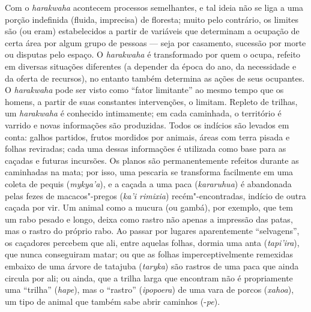 Com o \emph{harakwaha} acontecem processos semelhantes, e tal ideia não
se liga a uma porção indefinida (fluida, imprecisa) de floresta; muito
pelo contrário, os limites são (ou eram) estabelecidos a partir de
variáveis que determinam a ocupação de certa área por algum grupo de
pessoas --- seja por casamento, sucessão por morte ou disputas pelo
espaço. O \emph{harakwaha} é transformado por quem o ocupa, refeito em
diversas situações diferentes (a depender da época do ano, da
necessidade e da oferta de recursos), no entanto também determina as
ações de seus ocupantes. O \emph{harakwaha} pode ser visto como ``fator
limitante'' ao mesmo tempo que os homens, a partir de suas constantes
intervenções, o limitam. Repleto de trilhas, um \emph{harakwaha} é
conhecido intimamente; em cada caminhada, o território é varrido e novas
informações são produzidas. Todos os indícios são levados em conta:
galhos partidos, frutos mordidos por animais, áreas com terra pisada e
folhas reviradas; cada uma dessas informações é utilizada como base para
as caçadas e futuras incursões. Os planos são permanentemente refeitos
durante as caminhadas na mata; por isso, uma pescaria se transforma
facilmente em uma coleta de pequis (\emph{mykya'a}), e a caçada a uma
paca (\emph{kararuhua}) é abandonada pelas fezes de macacos"-pregos
(\emph{ka'i rimixia}) recém"-encontradas, indício de outra caçada por
vir. Um animal como a mucura (ou gambá), por exemplo, que tem um rabo
pesado e longo, deixa como rastro não apenas a impressão das patas, mas
o rastro do próprio rabo. Ao passar por lugares aparentemente
``selvagens'', os caçadores percebem que ali, entre aquelas folhas,
dormia uma anta (\emph{tapi'ira}), que nunca conseguiram matar; ou que
as folhas imperceptivelmente remexidas embaixo de uma árvore de tatajuba
(\emph{taryka}) são rastros de uma paca que ainda circula por ali; ou
ainda, que a trilha larga que encontram não é propriamente uma
``trilha'' (\emph{hape}), mas o ``rastro'' (\emph{ipopoera}) de uma vara
de porcos (\emph{xahoa}), um tipo de animal que também sabe abrir
caminhos (-\emph{pe}).

